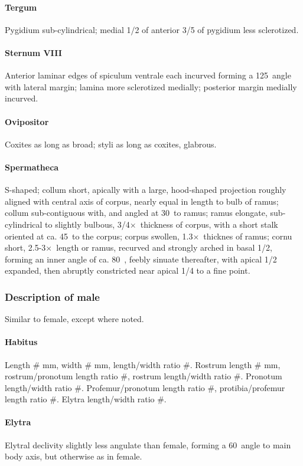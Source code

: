 \documentclass[fleqn,10pt,lineno]{wlpeerj} %
\newcommand{\td}{\textdegree~}
\newcommand{\x}{$\times$~}
\begin{document}
			\paragraph{Tergum}
				Pygidium sub-cylindrical; medial 1/2 of anterior 3/5 of pygidium less sclerotized.
			\paragraph{Sternum VIII}
				Anterior laminar edges of spiculum ventrale each incurved forming a 125\td angle with lateral margin; lamina more sclerotized medially; posterior margin medially incurved.
			\paragraph{Ovipositor}
				Coxites as long as broad; styli as long as coxites, glabrous.
			\paragraph{Spermatheca}
				S-shaped; collum short, apically with a large, hood-shaped projection roughly aligned with central axis of corpus, nearly equal in length to bulb of ramus; collum sub-contiguous with, and angled at 30\td to ramus; ramus elongate, sub-cylindrical to slightly bulbous, 3/4\x thickness of corpus, with a short stalk oriented at ca. 45\td to the corpus; corpus swollen, 1.3\x thicknes of ramus; cornu short, 2.5-3\x length or ramus, recurved and strongly arched in basal 1/2, forming an inner angle of ca. 80\td, feebly sinuate thereafter, with apical 1/2 expanded, then abruptly constricted near apical 1/4 to a fine point.
		\subsubsection*{Description of male}
			Similar to female, except where noted.
			\paragraph{Habitus}
				Length \# mm, width \# mm, length/width ratio \#. Rostrum length \# mm, rostrum/pronotum length ratio \#, rostrum length/width ratio \#. Pronotum length/width ratio \#. Profemur/pronotum length ratio \#, protibia/profemur length ratio \#. Elytra length/width ratio \#.
			\paragraph{Elytra}
				Elytral declivity slightly less angulate than female, forming a 60\td angle to main body axis, but otherwise as in female.
\end{document}
